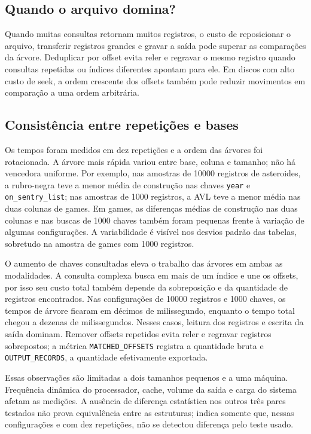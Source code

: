 \documentclass[12pt,a4paper]{article}
\begin{document}
\subsection{Quando o arquivo domina?}
Quando muitas consultas retornam muitos registros, o custo de reposicionar o arquivo, transferir registros grandes e gravar a saída pode superar as comparações da árvore. Deduplicar por offset evita reler e regravar o mesmo registro quando consultas repetidas ou índices diferentes apontam para ele. Em discos com alto custo de seek, a ordem crescente dos offsets também pode reduzir movimentos em comparação a uma ordem arbitrária.

\subsection{Consistência entre repetições e bases}
Os tempos foram medidos em dez repetições e a ordem das árvores foi rotacionada. A árvore mais rápida variou entre base, coluna e tamanho; não há vencedora uniforme. Por exemplo, nas amostras de 10000 registros de asteroides, a rubro-negra teve a menor média de construção nas chaves \texttt{year} e \texttt{on\_sentry\_list}; nas amostras de 1000 registros, a AVL teve a menor média nas duas colunas de games. Em games, as diferenças médias de construção nas duas colunas e nas buscas de 1000 chaves também foram pequenas frente à variação de algumas configurações. A variabilidade é visível nos desvios padrão das tabelas, sobretudo na amostra de games com 1000 registros.

O aumento de chaves consultadas eleva o trabalho das árvores em ambas as modalidades. A consulta complexa busca em mais de um índice e une os offsets, por isso seu custo total também depende da sobreposição e da quantidade de registros encontrados. Nas configurações de 10000 registros e 1000 chaves, os tempos de árvore ficaram em décimos de milissegundo, enquanto o tempo total chegou a dezenas de milissegundos. Nesses casos, leitura dos registros e escrita da saída dominam. Remover offsets repetidos evita reler e regravar registros sobrepostos; a métrica \texttt{MATCHED\_OFFSETS} registra a quantidade bruta e \texttt{OUTPUT\_RECORDS}, a quantidade efetivamente exportada.

Essas observações são limitadas a dois tamanhos pequenos e a uma máquina. Frequência dinâmica do processador, cache, volume da saída e carga do sistema afetam as medições. A ausência de diferença estatística nos outros três pares testados não prova equivalência entre as estruturas; indica somente que, nessas configurações e com dez repetições, não se detectou diferença pelo teste usado.
\end{document}
